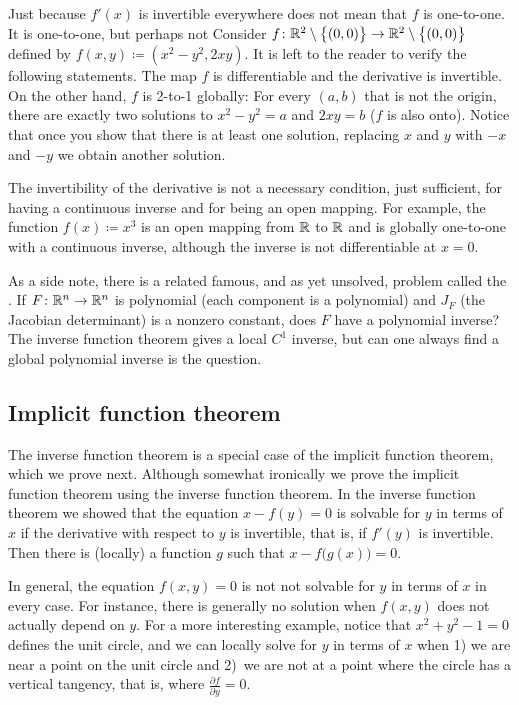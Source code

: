 \begin{example}
Just because $f'(x)$ is invertible everywhere does not
mean that $f$ is
one-to-one.  It is  one-to-one, but perhaps not
Consider $f \colon {\mathbb{R}}^2 \setminus \bigl\{ (0,0) \bigr\} \to
{\mathbb{R}}^2 \setminus \bigl\{ (0,0) \bigr\}$ defined
by $f(x,y) \coloneqq (x^2-y^2,2xy)$.
It is left to the reader to verify the following statements.
The map $f$ is differentiable and the derivative is invertible.
On the other hand, $f$ is 2-to-1 globally: For every
$(a,b)$ that is not the origin, there are exactly two
solutions to $x^2-y^2=a$ and $2xy=b$ ($f$ is also onto).  Notice that
once you show that there is at least one solution,
replacing $x$ and $y$ with $-x$ and $-y$ we obtain another solution.
\end{example}

The invertibility of the derivative is not a necessary
condition, just sufficient, for having a continuous inverse and for being an open
mapping.  For example, the function $f(x) \coloneqq x^3$ is an open mapping from ${\mathbb{R}}$
to ${\mathbb{R}}$ and is globally one-to-one with a continuous inverse, although the
inverse is not differentiable at $x=0$.

\medskip

As a side note, there is a related famous, and as yet unsolved, problem
called the \emph{}.  If $F \colon {\mathbb{R}}^n \to
{\mathbb{R}}^n$ is polynomial (each component is a polynomial) and $J_F$
(the Jacobian determinant) is a nonzero
constant, does $F$ have a polynomial inverse?
The inverse function theorem gives a local $C^1$ inverse, but can one always
find a global polynomial inverse is the question.

\subsection{Implicit function theorem}

The inverse function theorem is a special case of the implicit
function theorem, which we prove next.  Although somewhat ironically we 
prove the implicit function theorem using the inverse function theorem.
In the inverse function theorem we showed that
the equation $x-f(y) = 0$ is solvable for $y$ in terms of $x$ if the derivative
with respect to $y$ is invertible, that is, if $f'(y)$ is invertible.
Then there is (locally) a
function $g$ such that $x-f\bigl(g(x)\bigr) = 0$.

In general, the equation $f(x,y) = 0$ is not
not solvable for $y$ in terms of $x$ in every case.
For instance, there is generally no solution
when $f(x,y)$ does not actually depend on $y$.
For a more interesting example, notice that $x^2+y^2-1 = 0$ defines the unit circle, and
we can locally solve for $y$ in terms of $x$ when 1) we are near
a point on the unit circle and 2)~we are not at a point
where the circle has a vertical tangency, that is, where
$\frac{\partial f}{\partial y} = 0$.

